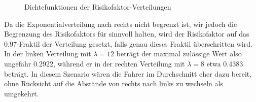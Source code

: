 \documentclass[10pt, a4paper]{article}
\begin{document}
\begin{figure}[h!]
    \centering
    \caption{Dichtefunktionen der Risikofaktor-Verteilungen}
    \label{fig:riskFactorDistributions}
\end{figure}

Da die Exponentialverteilung nach rechts nicht begrenzt ist, wir jedoch die Begrenzung des Risikofaktors für sinnvoll halten, wird der Risikofaktor auf das 0.97-Fraktil der Verteilung gesetzt, falls genau dieses Fraktil überschritten wird. In der linken Verteilung mit $\lambda = 12$ beträgt der maximal zulässige Wert also ungefähr 0.2922, während er in der rechten Verteilung mit $\lambda = 8$ etwa 0.4383 beträgt. In diesem Szenario wären die Fahrer im Durchschnitt eher dazu bereit, ohne Rücksicht auf die Abstände von rechts nach links zu wechseln als umgekehrt.
\end{document}

